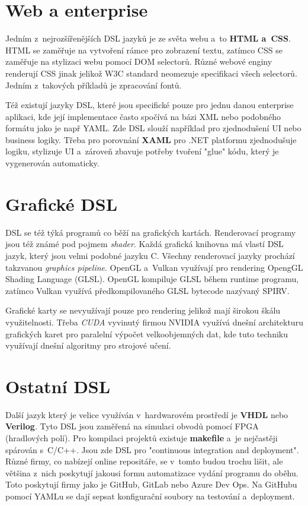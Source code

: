 \documentclass[male, czech]{kithesis}
\begin{document}
\section{Web a enterprise}
Jedním z~nejrozšířenějších DSL jazyků je ze světa webu a~to \textbf{HTML a~CSS}. 
HTML se zaměřuje na vytvoření rámce pro zobrazení textu,
zatímco CSS se zaměřuje na stylizaci webu pomocí DOM selectorů. 
Různé webové enginy renderují CSS jinak jelikož W3C standard neomezuje specifikaci
všech selectorů.
Jedním z~takových příkladů je zpracování fontů.

Též existují jazyky DSL, 
které jsou specifické pouze pro jednu danou enterprise aplikaci, 
kde její implementace často spočívá na bázi XML nebo podobného formátu jako je např YAML. 
Zde DSL slouží například pro zjednodušení UI nebo business logiky. 
Třeba pro porovnání \textbf{XAML} pro .NET platformu zjednodušuje logiku, 
stylizuje UI a~zároveň zbavuje potřeby tvoření "glue" kódu, 
který je vygenerován automaticky.

\section{Grafické DSL}
DSL se též týká programů co běží na grafických kartách. 
Renderovací programy jsou též známé pod pojmem \textit{shader}.
Každá grafická knihovna má vlastí DSL jazyk, 
který jsou velmi podobné jazyku C.
Všechny renderovací jazyky prochází takzvanou \textit{graphics pipeline}. 
OpenGL a~Vulkan využívají pro rendering OpengGL Shading Language (GLSL). 
OpenGL kompiluje GLSL během runtime programu,
zatímco Vulkan využívá předkompilovaného GLSL bytecode nazývaný SPIRV.

Grafické karty se nevyužívají pouze pro rendering jelikož mají širokou škálu
využitelnosti. 
Třeba \textit{CUDA} vyvinutý firmou NVIDIA 
využívá dnešní architekturu grafických karet pro paralelní výpočet 
velkoobjemných dat, kde tuto techniku využívají dnešní algoritmy pro 
strojové učení. 

\section{Ostatní DSL}
Další jazyk který je velice využíván v~hardwarovém prostředí je \textbf{VHDL} nebo \textbf{Verilog}. 
Tyto DSL jsou zaměřená na simulaci obvodů pomocí FPGA (hradlových polí). 
Pro kompilaci projektů existuje \textbf{makefile} a~je nejčastěji spárován s~C/C++. 
Jsou zde DSL pro "continuous integration and deployment". 
Různé firmy,
co nabízejí online repositáře,
se v~tomto budou trochu lišit, 
ale většina z~nich poskytují jakousi formu automatizace vydání programu do oběhu.
Toto poskytují firmy jako je GitHub,
GitLab nebo Azure Dev Ops. 
Na GitHubu pomocí YAMLu se dají sepsat konfigurační soubory 
na testování a~deployment.
\end{document}
